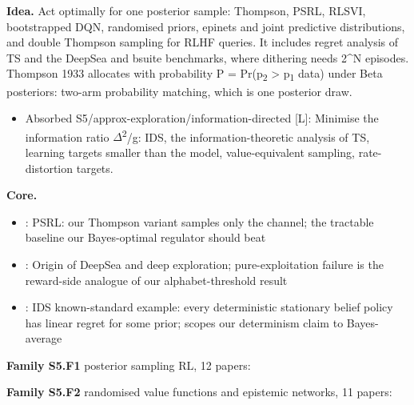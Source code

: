 \documentclass[10pt]{article}
\newcommand{\memb}[1]{\par\smallskip\textbf{#1}\quad}
\begin{document}
\textbf{Idea.} Act optimally for one posterior sample: Thompson, PSRL, RLSVI, bootstrapped DQN, randomised priors, epinets and joint predictive distributions, and double Thompson sampling for RLHF queries. It includes regret analysis of TS and the DeepSea and bsuite benchmarks, where dithering needs 2\^{}N episodes. Thompson 1933 allocates with probability P = Pr(p\textsubscript{2} \textgreater{} p\textsubscript{1} \textbar{} data) under Beta posteriors: two-arm probability matching, which is one posterior draw.
\begin{itemize}[nosep,leftmargin=1.2em]
\item Absorbed S5/approx-exploration/information-directed [L]: Minimise the information ratio \ensuremath{\Delta}\textsuperscript{2}/g: IDS, the information-theoretic analysis of TS, learning targets smaller than the model, value-equivalent sampling, rate-distortion targets.
\end{itemize}


\memb{Core.}
\begin{itemize}[nosep,leftmargin=1.2em]
\item \citet{Osband-more13}: PSRL: our Thompson variant samples only the channel; the tractable baseline our Bayes-optimal regulator should beat
\item \citet{Osband-deep17}: Origin of DeepSea and deep exploration; pure-exploitation failure is the reward-side analogue of our alphabet-threshold result
\item \citet{Russo-learning14}: IDS known-standard example: every deterministic stationary belief policy has linear regret for some prior; scopes our determinism claim to Bayes-average
\end{itemize}
\memb{Family S5.F1} posterior sampling RL, 12 papers: {\footnotesize \citetext{\citealp{Osband-more13}; \citealp{Thompson-likelihood33}; \citealp{Strens-bayesian00}\dag; \citealp{Ortega-minimum08}; \citealp{Agrawal-analysis12}; \citealp{Asmuth-bayesian12}; \citealp{Osband-model14}; \citealp{Russo-learning14b}; \citealp{Osband-posterior16}; \citealp{Ouyang-learning17}; \citealp{Russo-tutorial17}; \citealp{Agrawal-optimistic23}}}

\memb{Family S5.F2} randomised value functions and epistemic networks, 11 papers: {\footnotesize \citetext{\citealp{Osband-deep17}; \citealp{Osband-generalization14}; \citealp{Osband-deep16}; \citealp{Chen-ucb17}; \citealp{Osband-randomized18}; \citealp{Dwaracherla-hypermodels20}; \citealp{Osband-epistemic21}; \citealp{Osband-neural21}; \citealp{Wen-predictions21}; \citealp{Osband-approximate23}; \citealp{Dwaracherla-efficient24}}}
\end{document}
